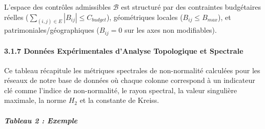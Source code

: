 \documentclass[10pt, a4paper]{article}
\begin{document}
L'espace des contrôles admissibles \(\mathcal{B}\) est structuré par des
contraintes budgétaires réelles
(\(\sum_{(i,j) \in E} |B_{ij}| \le C_{budget}\)), géométriques locales
(\(B_{ij} \le B_{max}\)), et patrimoniales/géographiques (\(B_{ij} = 0\)
sur les axes non modifiables).

\paragraph{3.1.7 Données Expérimentales d'Analyse Topologique et
Spectrale}\label{donnuxe9es-expuxe9rimentales-danalyse-topologique-et-spectrale}

Ce tableau récapitule les métriques spectrales de non-normalité
calculées pour les réseaux de notre base de données où chaque colonne
correspond à un indicateur clé comme l'indice de non-normalité, le rayon
spectral, la valeur singulière maximale, la norme \(H_2\) et la
constante de Kreiss.

\subparagraph{Tableau 2 : Exemple}\label{tableau-2-exemple}
\end{document}
